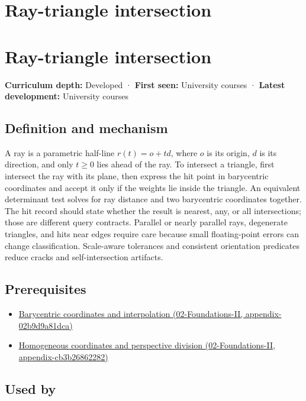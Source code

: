 \hypertarget{appendix-47ac1bd6d144}{}
\section*{Ray-triangle intersection}
\section{Ray-triangle intersection}\label{ray-triangle-intersection}

\textbf{Curriculum depth:} Developed · \textbf{First seen:} University courses · \textbf{Latest development:} University courses

\subsection{Definition and mechanism}\label{definition-and-mechanism}

A ray is a parametric half-line \(r(t)=o+td\), where \(o\) is its origin, \(d\) is its direction, and only \(t\ge0\) lies ahead of the ray. To intersect a triangle, first intersect the ray with its plane, then express the hit point in barycentric coordinates and accept it only if the weights lie inside the triangle. An equivalent determinant test solves for ray distance and two barycentric coordinates together. The hit record should state whether the result is nearest, any, or all intersections; those are different query contracts. Parallel or nearly parallel rays, degenerate triangles, and hits near edges require care because small floating-point errors can change classification. Scale-aware tolerances and consistent orientation predicates reduce cracks and self-intersection artifacts.

\subsection{Prerequisites}\label{prerequisites}

\begin{itemize}
\tightlist
\item
  \href{}{Barycentric coordinates and interpolation (02-Foundations-II, appendix-02b9d9a81dca)}
\item
  \href{}{Homogeneous coordinates and perspective division (02-Foundations-II, appendix-cb3b26862282)}
\end{itemize}

\subsection{Used by}\label{used-by}

